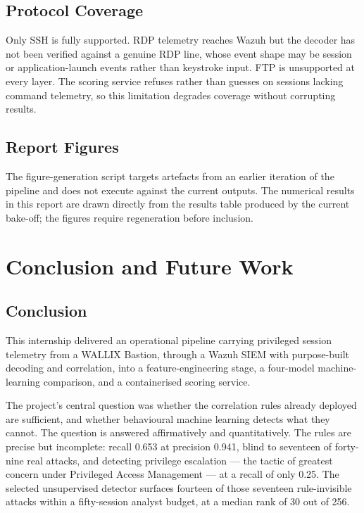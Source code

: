 \documentclass{classeENS}
\begin{document}
\subsection{Protocol Coverage}
Only SSH is fully supported. RDP telemetry reaches Wazuh but the decoder has not been verified against a genuine RDP line, whose event shape may be session or application-launch events rather than keystroke input. FTP is unsupported at every layer. The scoring service refuses rather than guesses on sessions lacking command telemetry, so this limitation degrades coverage without corrupting results.

\subsection{Report Figures}
The figure-generation script targets artefacts from an earlier iteration of the pipeline and does not execute against the current outputs. The numerical results in this report are drawn directly from the results table produced by the current bake-off; the figures require regeneration before inclusion.

\section{Conclusion and Future Work}
\label{sec:future}

\subsection{Conclusion}
This internship delivered an operational pipeline carrying privileged session telemetry from a WALLIX Bastion, through a Wazuh SIEM with purpose-built decoding and correlation, into a feature-engineering stage, a four-model machine-learning comparison, and a containerised scoring service.

The project's central question was whether the correlation rules already deployed are sufficient, and whether behavioural machine learning detects what they cannot. The question is answered affirmatively and quantitatively. The rules are precise but incomplete: recall 0.653 at precision 0.941, blind to seventeen of forty-nine real attacks, and detecting privilege escalation --- the tactic of greatest concern under Privileged Access Management --- at a recall of only 0.25. The selected unsupervised detector surfaces fourteen of those seventeen rule-invisible attacks within a fifty-session analyst budget, at a median rank of 30 out of 256.
\end{document}
